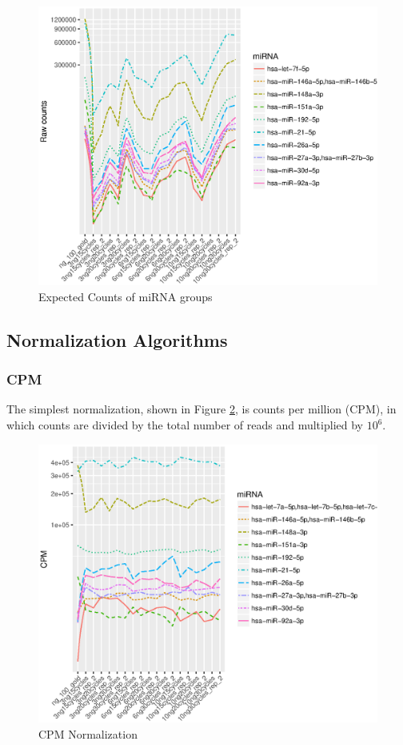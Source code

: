 \documentclass{bioinfo}
\begin{document}
\begin{methods}
\begin{figure}[!tpb]
\centerline{\includegraphics[scale=0.5]{fig-1-raw.eps}}
\caption{Expected Counts of miRNA groups}\label{fig:1}
\end{figure}

\vspace{4pt} 
  
\subsection{Normalization Algorithms}
\subsubsection{CPM}
The simplest normalization, shown in Figure \ref{fig:2}, is counts per million (CPM), in which counts are divided by the total number of reads and multiplied by $10^6$. \\
\begin{figure}[!tpb]
\centerline{\includegraphics[scale=0.5]{Fig-2-cpm.eps}}
\caption{CPM Normalization}\label{fig:2}
\end{figure} 


\end{methods}
\end{document}
